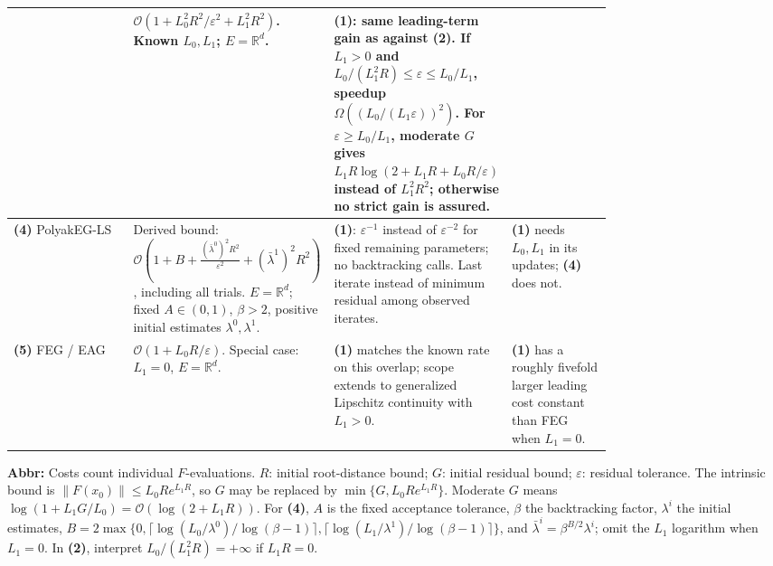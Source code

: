 \begin{table}[tp]
\begin{threeparttable}
\begin{tabularx}{\linewidth}{@{}>{\raggedright\arraybackslash}p{0.20\linewidth}>{\raggedright\arraybackslash}p{0.32\linewidth}>{\raggedright\arraybackslash}p{0.25\linewidth}>{\raggedright\arraybackslash}X@{}}
& $\mathcal{O}(1+L_0^2R^2/\varepsilon^2+L_1^2R^2)$.
Known $L_0,L_1$; $E=\mathbb{R}^d$.
& \textbf{(1)}: same leading-term gain as against \textbf{(2)}. If $L_1>0$ and $L_0/(L_1^2R)\le\varepsilon\le L_0/L_1$, speedup $\Omega((L_0/(L_1\varepsilon))^2)$. For $\varepsilon\ge L_0/L_1$, moderate $G$ gives $L_1R\log(2+L_1R+L_0R/\varepsilon)$ instead of $L_1^2R^2$; otherwise no strict gain is assured.
& \\
\midrule
\textbf{(4)} PolyakEG-LS \citep[Thm.~3.4, Prop.~3.5(a)]{glmYoonEtAl2026v1}
& Derived bound:
$\mathcal{O}\!\left(1+B+\frac{(\bar\lambda^0)^2R^2}{\varepsilon^2}+(\bar\lambda^1)^2R^2\right)$,
including all trials. $E=\mathbb{R}^d$; fixed $A\in(0,1)$, $\beta>2$, positive initial estimates $\lambda^0,\lambda^1$.
& \textbf{(1)}: $\varepsilon^{-1}$ instead of $\varepsilon^{-2}$ for fixed remaining parameters; no backtracking calls. Last iterate instead of minimum residual among observed iterates.
& \textbf{(1)} needs $L_0,L_1$ in its updates; \textbf{(4)} does not. \\
\midrule
\textbf{(5)} FEG / EAG \citep[Thm.~4.1, $\rho=0$]{glmLeeKim2021v3}\citep[Thms.~1--2, Sec.~2.3]{glmYoonRyu2021v2}
& $\mathcal{O}(1+L_0R/\varepsilon)$.
Special case: $L_1=0$, $E=\mathbb{R}^d$.
& \textbf{(1)} matches the known rate on this overlap; scope extends to generalized Lipschitz continuity with $L_1>0$.
& \textbf{(1)} has a roughly fivefold larger leading cost constant than FEG when $L_1=0$. \\
\bottomrule
\end{tabularx}
\begin{tablenotes}[flushleft]\footnotesize
\item[] \textbf{Abbr:} Costs count individual $F$-evaluations. $R$: initial root-distance bound; $G$: initial residual bound; $\varepsilon$: residual tolerance. The intrinsic bound is $\|F(x_0)\|\le L_0R e^{L_1R}$, so $G$ may be replaced by $\min\{G,L_0R e^{L_1R}\}$. Moderate $G$ means $\log(1+L_1G/L_0)=\mathcal{O}(\log(2+L_1R))$. For \textbf{(4)}, $A$ is the fixed acceptance tolerance, $\beta$ the backtracking factor, $\lambda^i$ the initial estimates,
$B=2\max\{0,\lceil\log(L_0/\lambda^0)/\log(\beta-1)\rceil,\lceil\log(L_1/\lambda^1)/\log(\beta-1)\rceil\}$,
and $\bar\lambda^i=\beta^{B/2}\lambda^i$; omit the $L_1$ logarithm when $L_1=0$. In \textbf{(2)}, interpret $L_0/(L_1^2R)=+\infty$ if $L_1R=0$.
\end{tablenotes}
\end{threeparttable}
\end{table}
\clearpage
